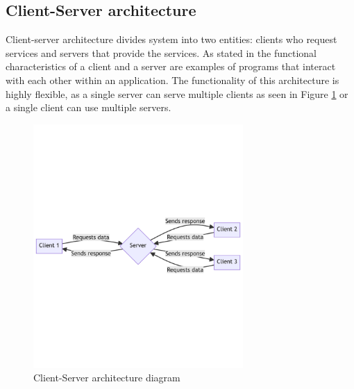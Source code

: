 

\subsection{Client-Server architecture}
Client-server architecture divides system into two entities: clients who request services and servers that provide the services.
As stated in \cite{mediumArchitectureComparison} the functional characteristics of a client and a server are examples of programs that interact with each other within an application. The functionality of this architecture is highly flexible, as a single server can serve multiple clients as seen in Figure \ref{img03:client_server_architecture_diagram} or a single client can use multiple servers.
\begin{figure}[H]\centering
\includegraphics[width=80mm]{img/chap03/fig_client_server_architecture_mermaid.png}
\caption{Client-Server architecture diagram}
\label{img03:client_server_architecture_diagram}
\end{figure}


   

